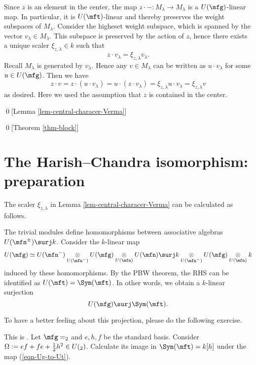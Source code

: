 	Since $z$ is an element in the center, the map $z\cdot - :M_\lambda \to M_\lambda$ is a $U(\mfg)$-linear map. In particular, it is $U(\mft)$-linear and thereby preserves the weight subspaces of $M_\lambda$. Consider the higheset weight subspace, which is spanned by the vector $v_\lambda\in M_\lambda$. This subspace is preserved by the action of $z$, hence there exists a unique scaler $\xi_{z,\lambda}\in k$ such that
	\[
		z\cdot v_\lambda = \xi_{z,\lambda}v_\lambda.
	\]
	Recall $M_\lambda$ is generated by $v_\lambda$. Hence any $v\in M_\lambda$ can be written as $u\cdot v_\lambda$ for some $u\in U(\mfg)$. Then we have
	\[
		z\cdot v = z \cdot (u \cdot v_\lambda) = u\cdot (z\cdot v_\lambda) = \xi_{z,\lambda} u\cdot v_\lambda = \xi_{z,\lambda}v
	\]
	as desired. Here we used the assumption that $z$ is contained in the center.


\qed[Lemma \ref{lem-central-characer-Verma}]

\qed[Theorem \ref{thm-block}]

\section{The Harish--Chandra isomorphism: preparation}

The scaler $\xi_{z,\lambda}$ in Lemma \ref{lem-central-characer-Verma} can be calculated as follows.

\begin{constr}
	The trivial modules define homomorphisms between associative algebras $U(\mfn^\pm) \surj k$. Consider the $k$-linear map
	\[
		U(\mfg) \simeq U(\mfn^-) \ot_{U(\mfn^-)} U(\mfg) \ot_{U(\mfn)} U(\mfn) \surj k \ot_{U(\mfn^-)} U(\mfg) \ot_{U(\mfn)} k
	\]
	induced by these homomorphisms. By the PBW theorem, the RHS can be identified as $U(\mft)= \Sym(\mft)$. In other words, we obtain a $k$-linear surjection 
	\begin{equation} \label{eqn-Ug-to-Ut}
		U(\mfg) \surj \Sym(\mft).
	\end{equation}
\end{constr}

To have a better feeling about this projection, please do the following exercise.

\begin{exe} 
	This is . Let $\mfg=\sl_2$ and $e,h,f$ be the standard basis. Consider $\Omega:=ef+fe+\frac{1}{2}h^2\in U(\sl_2)$. Calculate its image in $\Sym(\mft)=k[h]$ under the map (\ref{eqn-Ug-to-Ut}).
\end{exe}

